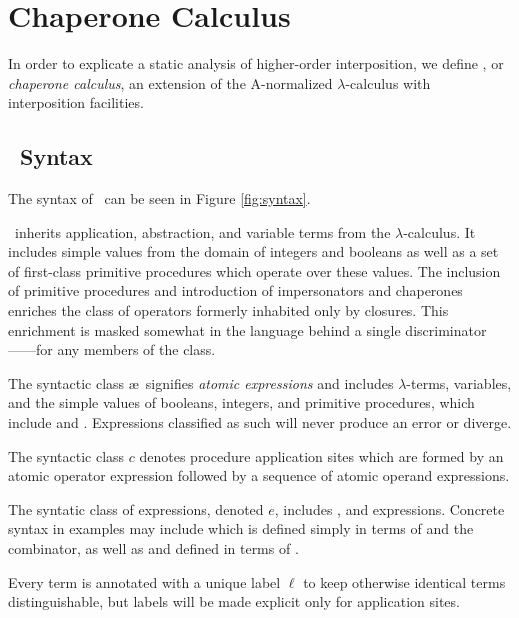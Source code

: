 \section{Chaperone Calculus}

In order to explicate a static analysis of higher-order interposition, we define \chapcalc, or \emph{chaperone calculus}, an extension of the A-normalized $\lambda$-calculus with interposition facilities.



\subsection{\chapcalc\ Syntax}

The syntax of \chapcalc\ can be seen in Figure \ref{fig:syntax}.

\chapcalc\ inherits application, abstraction, and variable terms from the $\lambda$-calculus.
It includes simple values from the domain of integers and booleans as well as a set of first-class primitive procedures which operate over these values.
The inclusion of primitive procedures and introduction of impersonators and chaperones enriches the class of operators formerly inhabited only by closures.
This enrichment is masked somewhat in the language behind a single discriminator------for any members of the class.

The syntactic class \ae\ signifies \emph{atomic expressions} and includes $\lambda$-terms, variables, and the simple values of booleans, integers, and primitive procedures, which include  and .
Expressions classified as such will never produce an error or diverge.

The syntactic class $c$ denotes procedure application sites which are formed by an atomic operator expression followed by a sequence of atomic operand expressions.

The syntatic class of expressions, denoted $e$, includes , and  expressions.
Concrete syntax in examples may include  which is defined simply in terms of  and the  combinator, as well as  and  defined in terms of .

Every term is annotated with a unique label $\ell$ to keep otherwise identical terms distinguishable, but labels will be made explicit only for application sites.

